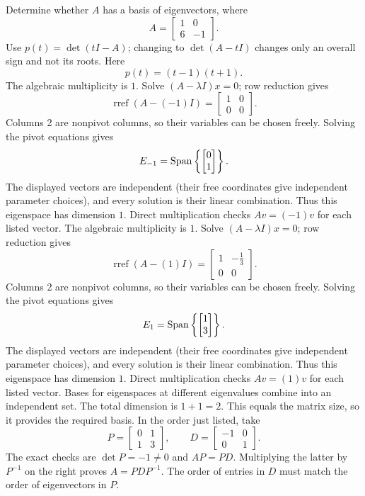 \goal Determine whether $A$ has a basis of eigenvectors, where
\[A=\begin{bmatrix}1&0\\6&-1\end{bmatrix}.\]
Use $p(t)=\det(tI-A)$; changing to $\det(A-tI)$ changes only an overall sign and not its roots. Here
\[p(t)=\left(t - 1\right) \left(t + 1\right).\]
The algebraic multiplicity is $1$. Solve $(A-\lambda I)x=0$; row reduction gives
\[\operatorname{rref}(A-(-1)I)=\begin{bmatrix}1&0\\0&0\end{bmatrix}.\]
Columns 2 are nonpivot columns, so their variables can be chosen freely. Solving the pivot equations gives
\[E_{-1}=\operatorname{Span}\left\{\begin{bmatrix}0\\1\end{bmatrix}\right\}.\]
The displayed vectors are independent (their free coordinates give independent parameter choices), and every solution is their linear combination. Thus this eigenspace has dimension $1$. Direct multiplication checks $Av=(-1)v$ for each listed vector.
The algebraic multiplicity is $1$. Solve $(A-\lambda I)x=0$; row reduction gives
\[\operatorname{rref}(A-(1)I)=\begin{bmatrix}1&- \frac{1}{3}\\0&0\end{bmatrix}.\]
Columns 2 are nonpivot columns, so their variables can be chosen freely. Solving the pivot equations gives
\[E_{1}=\operatorname{Span}\left\{\begin{bmatrix}1\\3\end{bmatrix}\right\}.\]
The displayed vectors are independent (their free coordinates give independent parameter choices), and every solution is their linear combination. Thus this eigenspace has dimension $1$. Direct multiplication checks $Av=(1)v$ for each listed vector.
Bases for eigenspaces at different eigenvalues combine into an independent set. The total dimension is $1+1=2$.
This equals the matrix size, so it provides the required basis. In the order just listed, take
\[P=\begin{bmatrix}0&1\\1&3\end{bmatrix},\qquad D=\begin{bmatrix}-1&0\\0&1\end{bmatrix}.\]
The exact checks are $\det P=-1\ne0$ and $AP=PD$. Multiplying the latter by $P^{-1}$ on the right proves $A=PDP^{-1}$. The order of entries in $D$ must match the order of eigenvectors in $P$.



